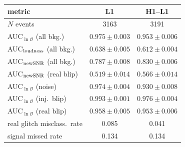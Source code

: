 \begin{tabular}{lcc}
\hline
metric & L1 & H1--L1 \\
\hline
$N$ events & 3163 & 3191 \\
AUC$_{\ln\mathcal{O}}$ (all bkg.) & $0.975 \pm 0.003$ & $0.953 \pm 0.006$ \\
AUC$_{\rm loudness}$ (all bkg.) & $0.638 \pm 0.005$ & $0.612 \pm 0.004$ \\
AUC$_{\rm newSNR}$ (all bkg.) & $0.787 \pm 0.008$ & $0.830 \pm 0.006$ \\
AUC$_{\rm newSNR}$ (real blip) & $0.519 \pm 0.014$ & $0.566 \pm 0.014$ \\
AUC$_{\ln\mathcal{O}}$ (noise) & $0.974 \pm 0.004$ & $0.930 \pm 0.008$ \\
AUC$_{\ln\mathcal{O}}$ (inj.\ blip) & $0.993 \pm 0.001$ & $0.976 \pm 0.004$ \\
AUC$_{\ln\mathcal{O}}$ (real blip) & $0.958 \pm 0.005$ & $0.953 \pm 0.006$ \\
real glitch misclass.\ rate & 0.085 & 0.041 \\
signal missed rate & 0.134 & 0.134 \\
\hline
\end{tabular}